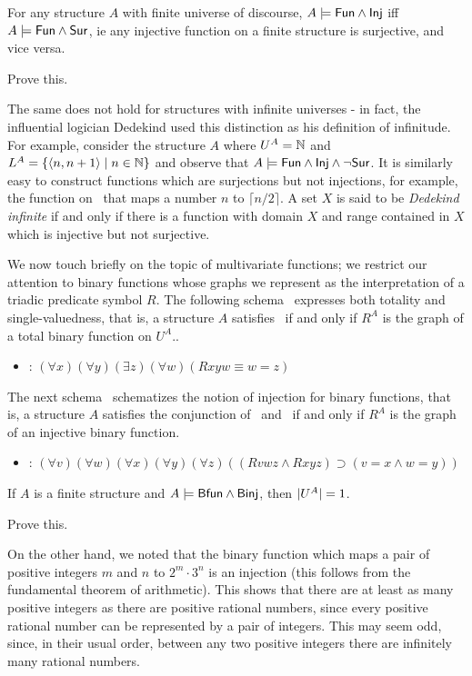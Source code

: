 For any structure $A$ with finite universe of discourse, $A \models \mbox{$\mathsf{Fun}$} \land \mbox{$\mathsf{Inj}$}$ iff $A \models \mbox{$\mathsf{Fun}$} \wedge \mbox{$\mathsf{Sur}$}$, ie any injective function on a finite structure is surjective, and vice versa. 

\begin{aside}
    Prove this. 
\end{aside}

The same does not hold for structures with infinite universes - in fact, the influential logician Dedekind used this distinction as his definition of infinitude. For example, consider the structure $A$ where $U^A=\mbox{$\mathbb{N}$}$ and $L^A=\{\mbox{$\langle n,n+1 \rangle$}\mid n\in\mbox{$\mathbb{N}$}\}$ and observe that $A\models\mbox{$\mathsf{Fun}$}\wedge\mbox{$\mathsf{Inj}$}\wedge\neg\mbox{$\mathsf{Sur}$}$. It is similarly easy to construct functions which are surjections but not injections, for example, the function on \N\ that maps a number $n$ to $\lceil n/2\rceil$.  A set $X$ is said to be \emph{Dedekind infinite} if and only if there is a function with domain $X$ and range contained in $X$ which is injective but not surjective.


We now touch briefly on the topic of multivariate functions; we restrict our attention to binary functions whose graphs we represent as the interpretation of a triadic predicate symbol $R$. The following schema \bfun\ expresses both totality and single-valuedness, that is, a structure $A$ satisfies \bfun\ if and only if $R^A$ is the graph of a total binary function on $U^A$..
\begin{itemize}
\item
\bfun: $(\forall x)(\forall y)(\exists
z)(\forall 
w)(Rxyw\equiv w = z)$
\end{itemize}
The next schema \binj\ schematizes the notion of injection for binary functions, that is, a structure $A$ satisfies the conjunction of \bfun\ and \binj\ if and only if $R^A$ is the graph of an injective binary function.
\begin{itemize}
\item 
\binj: $(\forall v)(\forall w)(\forall x)(\forall y)(\forall z)((Rvwz \wedge Rxyz)
\supset (v = x \wedge w = y))$
\end{itemize}
If $A$ is a finite structure and $A\models\mbox{$\mathsf{Bfun}$}\wedge\mbox{$\mathsf{Binj}$}$, then $\mbox{$|U^A|$}=1$.

\begin{aside}
    Prove this.
\end{aside}

On the other hand, we noted that the binary function which maps a pair of positive integers $m$ and $n$ to $2^m\cdot3^n$ is an injection (this follows from the fundamental theorem of arithmetic). This shows that there are at least as many positive integers as there are positive rational numbers, since every positive rational number can be represented by a pair of integers. This may seem odd, since, in their usual order, between any two positive integers there are infinitely many rational numbers. 


